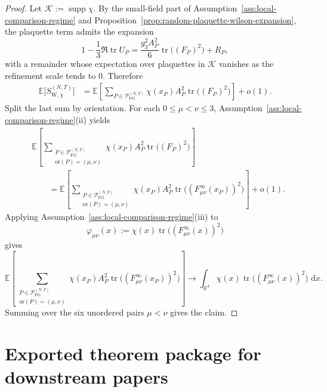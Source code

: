 \documentclass[11pt]{article}
\theoremstyle{definition}
\theoremstyle{remark}
\newcommand{\R}{\mathbb R}
\newcommand{\E}{\mathbb E}
\newcommand{\mcP}{\mathcal P}
\newcommand{\mcK}{\mathcal K}
\newcommand{\dd}{\,\mathrm d}
\newcommand{\tr}{\operatorname{tr}}
\newcommand{\supp}{\operatorname{supp}}
\begin{document}
\begin{proof}
Let \(\mcK:=\supp\chi\). By the small-field part of
Assumption~\ref{ass:local-comparison-regime} and
Proposition~\ref{prop:random-plaquette-wilson-expansion}, the plaquette term
admits the expansion
\[
1-\frac13\Re\tr U_P
=
\frac{g_3^2A_P^2}{6}\tr\!\bigl((F_P)^2\bigr)+R_P,
\]
with a remainder whose expectation over plaquettes in \(\mcK\) vanishes as the
refinement scale tends to \(0\). Therefore
\begin{align*}
\E\bigl[S_{\mathrm W,\chi}^{(N,T)}\bigr]
&=
\E\!\left[
\sum_{P\in\mcP_{\mathrm{FG}}^{(N,T)}}
\chi(x_P)A_P^2\tr\!\bigl((F_P)^2\bigr)
\right]
+o(1).
\end{align*}
Split the last sum by orientation. For each \(0\le\mu<\nu\le3\),
Assumption~\ref{ass:local-comparison-regime}\textnormal{(ii)} yields
\begin{align*}
&\E\!\left[
\sum_{\substack{P\in\mcP_{\mathrm{FG}}^{(N,T)}\\ \mathrm{or}(P)=(\mu,\nu)}}
\chi(x_P)A_P^2\tr\!\bigl((F_P)^2\bigr)
\right]\\
&\qquad=
\E\!\left[
\sum_{\substack{P\in\mcP_{\mathrm{FG}}^{(N,T)}\\ \mathrm{or}(P)=(\mu,\nu)}}
\chi(x_P)A_P^2\tr\!\bigl((F_{\mu\nu}^\infty(x_P))^2\bigr)
\right]
+o(1).
\end{align*}
Applying Assumption~\ref{ass:local-comparison-regime}\textnormal{(iii)} to
\[
\varphi_{\mu\nu}(x):=\chi(x)\tr\!\bigl((F_{\mu\nu}^\infty(x))^2\bigr)
\]
gives
\[
\E\!\left[
\sum_{\substack{P\in\mcP_{\mathrm{FG}}^{(N,T)}\\ \mathrm{or}(P)=(\mu,\nu)}}
\chi(x_P)A_P^2\tr\!\bigl((F_{\mu\nu}^\infty(x_P))^2\bigr)
\right]
\longrightarrow
\int_{\R^4}\chi(x)\tr\!\bigl((F_{\mu\nu}^\infty(x))^2\bigr)\,\dd x.
\]
Summing over the six unordered pairs \(\mu<\nu\) gives the claim.
\end{proof}

\section{Exported theorem package for downstream papers}
\end{document}
